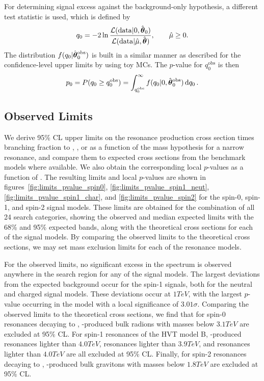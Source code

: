 For determining signal excess against the background-only hypothesis, a different test statistic is used, which is defined by
\begin{equation}
  q_0=-2\ln\frac{\mathcal{L}(\mathrm{data}|0,\hat{\vb*{\theta}}_0)}{\mathcal{L}(\mathrm{data}|\hat{\mu},\hat{\vb*{\theta}})},\qquad \hat{\mu}\geq0.
\end{equation}
The distribution $f(q_0|\hat{\vb*{\theta}}_0^\mathrm{obs})$ is built in a similar manner as described for the confidence-level upper limits by using toy MCs.
The $p$-value for $q_0^\mathrm{obs}$ is then
\begin{equation}
  p_0=P(q_0\geq q_0^\mathrm{obs})=\int_{q_0^\mathrm{obs}}^\infty f(q_0|0,\hat{\vb*{\theta}}_0^\mathrm{obs})\dd{q_0}.
\end{equation}

\subsection{Observed Limits}

We derive 95\% CL upper limits on the resonance production cross section times branching fraction to \WW, \WZ, or \WH as a function of the mass hypothesis \MX for a narrow resonance, and compare them to expected cross sections from the benchmark models where available.
We also obtain the corresponding local $p$-values as a function of \MX.
The resulting limits and local $p$-values are shown in figures~\ref{fig:limits_pvalue_spin0}, \ref{fig:limits_pvalue_spin1_neut}, \ref{fig:limits_pvalue_spin1_char}, and \ref{fig:limits_pvalue_spin2} for the spin-0, spin-1, and spin-2 signal models.
These limits are obtained for the combination of all 24 search categories, showing the observed and median expected limits with the 68\% and 95\% expected bands, along with the theoretical cross sections for each of the signal models.
By comparing the observed limits to the theoretical cross sections, we may set mass exclusion limits for each of the resonance models.

For the observed limits, no significant excess in the \MX spectrum is observed anywhere in the search region for any of the signal models.
The largest deviations from the expected background occur for the \VBF spin-1 signals, both for the neutral and charged signal models.
These deviations occur at $1\unit{TeV}$, with the largest $p$-value occurring in the \VBF\WprtoWZ model with a local significance of $3.01\sigma$.
Comparing the observed limits to the theoretical cross sections, we find that for spin-0 resonances decaying to \WW, \ggF-produced bulk radions with masses below $3.1\unit{TeV}$ are excluded at 95\% CL.
For spin-1 resonances of the HVT model B, \DY-produced \ZprtoWW resonances lighter than $4.0\unit{TeV}$, \WprtoWZ resonances lighter than $3.9\unit{TeV}$, and \WprtoWH resonances lighter than $4.0\unit{TeV}$ are all excluded at 95\% CL.
Finally, for spin-2 resonances decaying to \WW, \ggF-produced bulk gravitons with masses below $1.8\unit{TeV}$ are excluded at 95\% CL.

